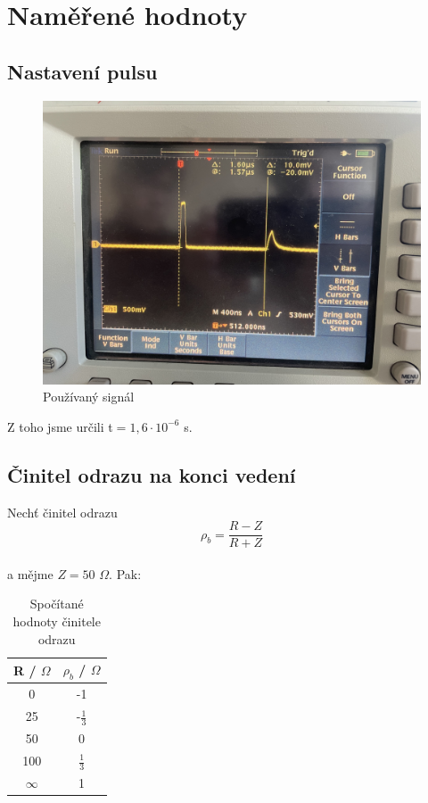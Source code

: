 
\section{Naměřené hodnoty}
\subsection{Nastavení pulsu}
\begin{figure}[h]
\centering
\includegraphics[width=14cm]{images/obr_1.jpg}
\caption{Používaný signál}
\label{fig:5}
\end{figure}

Z toho jsme určili t$=1,6 \cdot 10^{-6}$ s.
\newpage
\subsection{Činitel odrazu na konci vedení}
Nechť činitel odrazu \[\rho_b = \frac{R - Z}{R + Z}\] \\ a mějme $Z=50$ $\Omega$. Pak:

\begin{table}
    \centering
    \caption{Spočítané hodnoty činitele odrazu}
    \begin{tabular}{|c|c|}
       \hline
       R / $\Omega$ & $\rho_b$ / $\Omega$\\
       \hline
       0  & -1\\
       \hline
       25  & -$\frac{1}{3}$\\
       \hline
       50  & 0\\
       \hline
       100  & $\frac{1}{3}$\\
       \hline
       $\infty$ & 1\\
       \hline
    \end{tabular}
    \label{tab:1}
\end{table}
